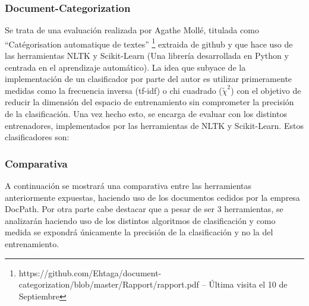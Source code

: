 \documentclass[runningheads,a4paper]{llncs}
\theoremstyle{break}
\begin{document}
\subsubsection{Document-Categorization}
\textbf{}

Se trata de una evaluación realizada por Agathe Mollé, titulada como ``Catégorisation automatique de textes''  \footnote{https://github.com/Ehtaga/document-categorization/blob/master/Rapport/rapport.pdf -- Última visita el 10 de Septiembre} extraida de github y que hace uso de las herramientas NLTK y Scikit-Learn (Una librería desarrollada en Python y centrada en el aprendizaje automático). La idea que subyace de la implementación de un clasificador por parte del autor es utilizar primeramente medidas como la frecuencia inversa (tf-idf) o chi cuadrado ($\tilde{\chi}^2$) con el objetivo de reducir la dimensión del espacio de entrenamiento sin comprometer la precisión de la clasificación. Una vez hecho esto, se encarga de evaluar con los distintos entrenadores, implementados por las herramientas de NLTK y Scikit-Learn. Estos clasificadores son:

\begin{Parallel}{0.45\textwidth}{0.45\textwidth}
\ParallelPar
\end{Parallel}



\subsubsection{Comparativa}
\textbf{}

A continuación se mostrará una comparativa entre las herramientas anteriormente expuestas, haciendo uso de los documentos cedidos por la empresa DocPath. Por otra parte cabe destacar que a pesar de ser 3 herramientas, se analizarán haciendo uso de los distintos algoritmos de clasificación y como medida se expondrá únicamente la precisión de la clasificación y no la del entrenamiento.
\end{document}
